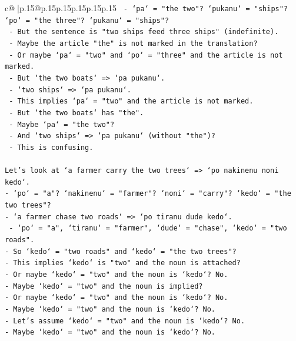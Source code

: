 \documentclass{article}
\begin{document}
{\begin{supertabular}{c@{$\;$}|p{.15\linewidth}@{}p{.15\linewidth}p{.15\linewidth}p{.15\linewidth}p{.15\linewidth}p{.15\linewidth}}
{{{\texttt{      {-} `pa` = "the two"? `pukanu` = "ships"? `po` = "the three"? `pukanu` = "ships"?} \\
\texttt{      {-} But the sentence is "two ships feed three ships" (indefinite).} \\
\texttt{      {-} Maybe the article "the" is not marked in the translation?} \\
\texttt{      {-} Or maybe `pa` = "two" and `po` = "three" and the article is not marked.} \\
\texttt{      {-} But `the two boats` => `pa pukanu`.} \\
\texttt{      {-} `two ships` => `pa pukanu`.} \\
\texttt{      {-} This implies `pa` = "two" and the article is not marked.} \\
\texttt{      {-} But `the two boats` has "the".} \\
\texttt{      {-} Maybe `pa` = "the two"?} \\
\texttt{      {-} And `two ships` => `pa pukanu` (without "the")?} \\
\texttt{      {-} This is confusing.} \\
\\ 
\texttt{Let's look at `a farmer carry the two trees` => `po nakinenu noni kedo`.} \\
\texttt{{-} `po` = "a"? `nakinenu` = "farmer"? `noni` = "carry"? `kedo` = "the two trees"?} \\
\texttt{{-} `a farmer chase two roads` => `po tiranu dude kedo`.} \\
\texttt{  {-} `po` = "a", `tiranu` = "farmer", `dude` = "chase", `kedo` = "two roads".} \\
\texttt{{-} So `kedo` = "two roads" and `kedo` = "the two trees"?} \\
\texttt{{-} This implies `kedo` is "two" and the noun is attached?} \\
\texttt{{-} Or maybe `kedo` = "two" and the noun is `kedo`? No.} \\
\texttt{{-} Maybe `kedo` = "two" and the noun is implied?} \\
\texttt{{-} Or maybe `kedo` = "two" and the noun is `kedo`? No.} \\
\texttt{{-} Maybe `kedo` = "two" and the noun is `kedo`? No.} \\
\texttt{{-} Let's assume `kedo` = "two" and the noun is `kedo`? No.} \\
\texttt{{-} Maybe `kedo` = "two" and the noun is `kedo`? No.} \\
}}}
\end{supertabular}}
\end{document}

